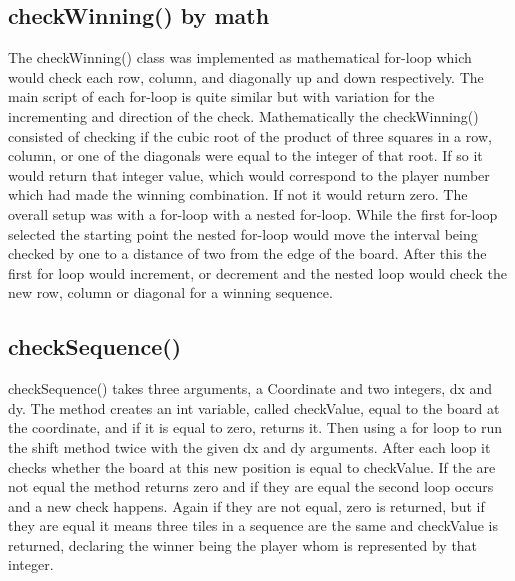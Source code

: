 \documentclass[a4paper,10pt]{article}
\begin{document}
\subsection{checkWinning() by math}
 The checkWinning() class was implemented as mathematical for-loop which would check each row, column, and diagonally up and down respectively. The main script of each for-loop is quite similar but with  variation for the incrementing and direction of the check. 
 Mathematically the checkWinning() consisted of checking if the cubic root of the product of three squares in a row, column, or one of the diagonals were equal to the integer of that root. If so it would return that integer value, which would correspond to the player number which had made the winning combination. If not it would return zero.  
 The overall setup was with a for-loop with a nested for-loop. While the first for-loop selected the starting point the nested for-loop would move the interval being checked by one to a distance of two from the edge of the board. After this the first for loop would increment, or decrement and the nested loop would check the new row, column or diagonal for a winning sequence.

\subsection{checkSequence()}
checkSequence() takes three arguments, a Coordinate and two integers, dx and dy. The method creates an int variable, called checkValue, equal to the board at the coordinate, and if it is equal to zero, returns it. Then using a for loop to run the shift method twice with the given dx and dy arguments. After each loop it checks whether the board at this new position is equal to checkValue. If the are not equal the method returns zero and if they are equal the second loop occurs and a new check happens. Again if they are not equal, zero is returned, but if they are equal it means three tiles in a sequence are the same and checkValue is returned, declaring the winner being the player whom is represented by that integer.
\end{document}
